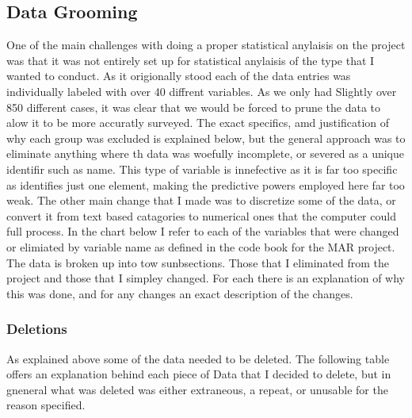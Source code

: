 \documentclass[12pt]{article}
\begin{document}
\subsection{Data Grooming}
One of the main challenges with doing a proper statistical anylaisis on the project was that it was not entirely set up for statistical anylaisis of the type that I wanted to conduct. As it origionally stood each of the data entries was individually labeled with over 40 diffrent variables. As we only had Slightly over 850 different cases, it was clear that we would be forced to prune the data to alow it to be more accuratly surveyed. The exact specifics, amd justification of why each group was excluded is explained below, but the general approach was to eliminate anything where th data was woefully incomplete, or severed as a unique identifir such as name. This type of variable is innefective as it is far too specific as identifies just one element, making the predictive powers employed here far too weak. The other main change that I made was to discretize some of the data, or convert it from text based catagories to numerical ones that the computer could full process. In the chart below I refer to each of the variables that were changed or elimiated by variable name as defined in the code book for the MAR project. The data is broken up into tow sunbsections. Those that I eliminated from the project and those that I simpley changed. For each there is an explanation of why this was done, and for any changes an exact description of the changes. 

\subsubsection{Deletions}
As explained above some of the data needed to be deleted. The following table offers an explanation behind each piece of Data that I decided to delete, but in gneneral what was deleted was either extraneous, a repeat, or unusable for the reason specified. 

\vspace{5mm}
\end{document}
